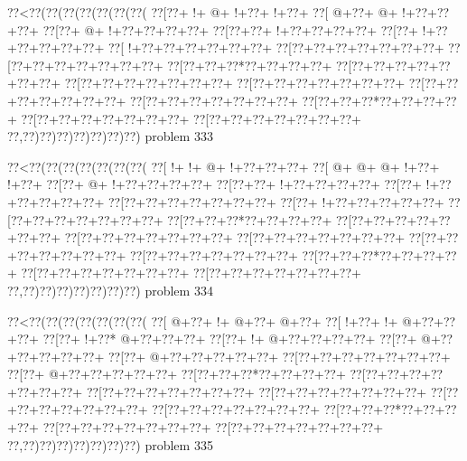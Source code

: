 \vbox{\vbox{\goo
\0??<\0??(\0??(\0??(\0??(\0??(\0??(\0??(
\0??[\0??+\- !+\- @+\- !+\0??+\- !+\0??+
\0??[\- @+\0??+\- @+\- !+\0??+\0??+\0??+
\0??[\0??+\- @+\- !+\0??+\0??+\0??+\0??+
\0??[\0??+\0??+\- !+\0??+\0??+\0??+\0??+
\0??[\0??+\- !+\0??+\0??+\0??+\0??+\0??+
\0??[\- !+\0??+\0??+\0??+\0??+\0??+\0??+
\0??[\0??+\0??+\0??+\0??+\0??+\0??+\0??+
\0??[\0??+\0??+\0??+\0??+\0??+\0??+\0??+
\0??[\0??+\0??+\0??*\0??+\0??+\0??+\0??+
\0??[\0??+\0??+\0??+\0??+\0??+\0??+\0??+
\0??[\0??+\0??+\0??+\0??+\0??+\0??+\0??+
\0??[\0??+\0??+\0??+\0??+\0??+\0??+\0??+
\0??[\0??+\0??+\0??+\0??+\0??+\0??+\0??+
\0??[\0??+\0??+\0??+\0??+\0??+\0??+\0??+
\0??[\0??+\0??+\0??*\0??+\0??+\0??+\0??+
\0??[\0??+\0??+\0??+\0??+\0??+\0??+\0??+
\0??[\0??+\0??+\0??+\0??+\0??+\0??+\0??+
\0??,\0??)\0??)\0??)\0??)\0??)\0??)\0??)
}
\hfil problem 333\hfil\break
}

\vbox{\vbox{\goo
\0??<\0??(\0??(\0??(\0??(\0??(\0??(\0??(
\0??[\- !+\- !+\- @+\- !+\0??+\0??+\0??+
\0??[\- @+\- @+\- @+\- !+\0??+\- !+\0??+
\0??[\0??+\- @+\- !+\0??+\0??+\0??+\0??+
\0??[\0??+\0??+\- !+\0??+\0??+\0??+\0??+
\0??[\0??+\- !+\0??+\0??+\0??+\0??+\0??+
\0??[\0??+\0??+\0??+\0??+\0??+\0??+\0??+
\0??[\0??+\- !+\0??+\0??+\0??+\0??+\0??+
\0??[\0??+\0??+\0??+\0??+\0??+\0??+\0??+
\0??[\0??+\0??+\0??*\0??+\0??+\0??+\0??+
\0??[\0??+\0??+\0??+\0??+\0??+\0??+\0??+
\0??[\0??+\0??+\0??+\0??+\0??+\0??+\0??+
\0??[\0??+\0??+\0??+\0??+\0??+\0??+\0??+
\0??[\0??+\0??+\0??+\0??+\0??+\0??+\0??+
\0??[\0??+\0??+\0??+\0??+\0??+\0??+\0??+
\0??[\0??+\0??+\0??*\0??+\0??+\0??+\0??+
\0??[\0??+\0??+\0??+\0??+\0??+\0??+\0??+
\0??[\0??+\0??+\0??+\0??+\0??+\0??+\0??+
\0??,\0??)\0??)\0??)\0??)\0??)\0??)\0??)
}
\hfil problem 334\hfil\break
}

\vbox{\vbox{\goo
\0??<\0??(\0??(\0??(\0??(\0??(\0??(\0??(
\0??[\- @+\0??+\- !+\- @+\0??+\- @+\0??+
\0??[\- !+\0??+\- !+\- @+\0??+\0??+\0??+
\0??[\0??+\- !+\0??*\- @+\0??+\0??+\0??+
\0??[\0??+\- !+\- @+\0??+\0??+\0??+\0??+
\0??[\0??+\- @+\0??+\0??+\0??+\0??+\0??+
\0??[\0??+\- @+\0??+\0??+\0??+\0??+\0??+
\0??[\0??+\0??+\0??+\0??+\0??+\0??+\0??+
\0??[\0??+\- @+\0??+\0??+\0??+\0??+\0??+
\0??[\0??+\0??+\0??*\0??+\0??+\0??+\0??+
\0??[\0??+\0??+\0??+\0??+\0??+\0??+\0??+
\0??[\0??+\0??+\0??+\0??+\0??+\0??+\0??+
\0??[\0??+\0??+\0??+\0??+\0??+\0??+\0??+
\0??[\0??+\0??+\0??+\0??+\0??+\0??+\0??+
\0??[\0??+\0??+\0??+\0??+\0??+\0??+\0??+
\0??[\0??+\0??+\0??*\0??+\0??+\0??+\0??+
\0??[\0??+\0??+\0??+\0??+\0??+\0??+\0??+
\0??[\0??+\0??+\0??+\0??+\0??+\0??+\0??+
\0??,\0??)\0??)\0??)\0??)\0??)\0??)\0??)
}
\hfil problem 335\hfil\break
}

